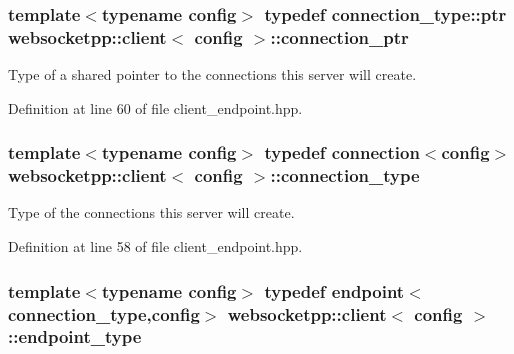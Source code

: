 \hypertarget{classwebsocketpp_1_1client_a2e187bbb2beac676bbfbc2e8065de83e}{}
\subsubsection[{connection\+\_\+ptr}]{\setlength{\rightskip}{0pt plus 5cm}template$<$typename config$>$ typedef {\bf connection\+\_\+type\+::ptr} {\bf websocketpp\+::client}$<$ config $>$\+::{\bf connection\+\_\+ptr}}\label{classwebsocketpp_1_1client_a2e187bbb2beac676bbfbc2e8065de83e}


Type of a shared pointer to the connections this server will create. 



Definition at line 60 of file client\+\_\+endpoint.\+hpp.

\hypertarget{classwebsocketpp_1_1client_a29c9f0410ed33a331faac19f8efea874}{}
\subsubsection[{connection\+\_\+type}]{\setlength{\rightskip}{0pt plus 5cm}template$<$typename config$>$ typedef {\bf connection}$<$config$>$ {\bf websocketpp\+::client}$<$ config $>$\+::{\bf connection\+\_\+type}}\label{classwebsocketpp_1_1client_a29c9f0410ed33a331faac19f8efea874}


Type of the connections this server will create. 



Definition at line 58 of file client\+\_\+endpoint.\+hpp.

\hypertarget{classwebsocketpp_1_1client_a37e4950ce23369e6614c28612b7ef0b4}{}
\subsubsection[{endpoint\+\_\+type}]{\setlength{\rightskip}{0pt plus 5cm}template$<$typename config$>$ typedef {\bf endpoint}$<${\bf connection\+\_\+type},config$>$ {\bf websocketpp\+::client}$<$ config $>$\+::{\bf endpoint\+\_\+type}}\label{classwebsocketpp_1_1client_a37e4950ce23369e6614c28612b7ef0b4}


